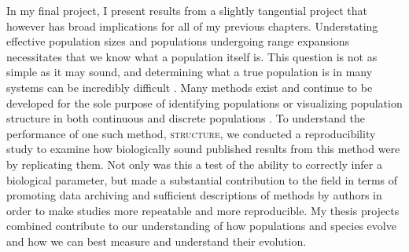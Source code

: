 In my final project,  I present results from a slightly tangential project that however has broad implications for all of my previous chapters. Understating effective population sizes and populations undergoing range expansions necessitates that we know what a population itself is. This question is not as simple as it may sound, and determining what a true population is in many systems can be incredibly difficult \citep{Waples:2006}. Many methods exist and continue to be developed for the sole purpose of identifying populations or visualizing population structure in both continuous and discrete populations \citep{Pritchard:2000, Falush:2003, Falush:2007, Rosenberg:2004, Petkova:2015, Bradburd:2016}. To understand the performance of one such method, \textsc{structure}, we conducted a reproducibility study to examine how biologically sound published results from this method were by replicating them. Not only was this a test of the ability to correctly infer a biological parameter, but made a substantial contribution to the field in terms of promoting data archiving and sufficient descriptions of methods by authors in order to make studies more repeatable and more reproducible. My thesis projects combined contribute to our understanding of how populations and species evolve and how we can best measure and understand their evolution.







